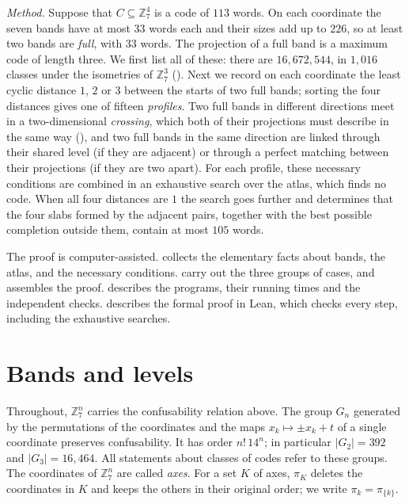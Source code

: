 \documentclass[11pt,colorlinks]{charlie}
\newcommand{\Zs}{\mathbb{Z}_7}
\begin{document}
\emph{Method.} Suppose that $C\subseteq\Zs^4$ is a code of $113$ words. On each coordinate the seven bands have at most $33$ words each and their sizes add up to $226$, so at least two bands are \emph{full}, with $33$ words. The projection of a full band is a maximum code of length three. We first list all of these: there are $16{,}672{,}544$, in $1{,}016$ classes under the isometries of $\Zs^3$ (). Next we record on each coordinate the least cyclic distance $1$, $2$ or $3$ between the starts of two full bands; sorting the four distances gives one of fifteen \emph{profiles}. Two full bands in different directions meet in a two-dimensional \emph{crossing}, which both of their projections must describe in the same way (), and two full bands in the same direction are linked through their shared level (if they are adjacent) or through a perfect matching between their projections (if they are two apart). For each profile, these necessary conditions are combined in an exhaustive search over the atlas, which finds no code. When all four distances are $1$ the search goes further and determines that the four slabs formed by the adjacent pairs, together with the best possible completion outside them, contain at most $105$ words.

The proof is computer-assisted.  collects the elementary facts about bands,  the atlas, and  the necessary conditions.  carry out the three groups of cases, and  assembles the proof.  describes the programs, their running times and the independent checks.  describes the formal proof in Lean, which checks every step, including the exhaustive searches.

\section{Bands and levels}\label{sec:bands}
Throughout, $\Zs^n$ carries the confusability relation above. The group $G_n$ generated by the permutations of the coordinates and the maps $x_k\mapsto\pm x_k+t$ of a single coordinate preserves confusability. It has order $n!\,14^n$; in particular $|G_2|=392$ and $|G_3|=16{,}464$. All statements about classes of codes refer to these groups. The coordinates of $\Zs^n$ are called \emph{axes}. For a set $K$ of axes, $\pi_K$ deletes the coordinates in $K$ and keeps the others in their original order; we write $\pi_k=\pi_{\{k\}}$.
\end{document}
